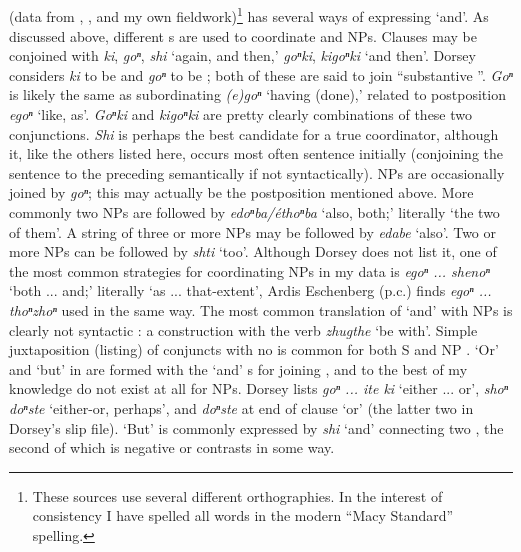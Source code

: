\documentclass[output=paper]{LSP/langsci}
\begin{document}
\subsection{}
 
\textbf{} (data from \citealt{DorseyNDPonka} \citealt{DorseyNDOmahaPonca},  \citealt{Koontz1984}, \citealt{Rudin2003} and my own fieldwork)\footnote{These sources use several different orthographies. In the interest of consistency I have spelled all  words in the modern ``Macy Standard'' spelling.} has several ways of expressing `and'. As discussed above, different s are used to coordinate  and NPs. Clauses may be conjoined with \textit{ki}, \textit{goⁿ}, \textit{shi} `again, and then,' \textit{goⁿki}, \textit{kigoⁿki} `and then'. Dorsey considers \textit{ki} to be  and \textit{goⁿ} to be ; both of these are said to join ``substantive ''. \textit{Goⁿ} is likely the same as subordinating \textit{(e)goⁿ} `having (done),' related to postposition \textit{egoⁿ} `like, as'. \textit{Goⁿki} and \textit{kigoⁿki} are pretty clearly combinations of these two conjunctions. \textit{Shi} is perhaps the best candidate for a true coordinator, although it, like the others listed here, occurs most often sentence initially (conjoining the sentence to the preceding  semantically if not syntactically). NPs are occasionally joined by \textit{goⁿ}; this may actually be the postposition mentioned above. More commonly two NPs are followed by \textit{edoⁿba/éthoⁿba} `also, both;' literally `the two of them'. A string of three or more NPs may be followed by \textit{edabe} `also'. Two or more NPs can be followed by \textit{shti} `too'. Although Dorsey does not list it, one of the most common strategies for coordinating NPs in my data is \textit{egoⁿ ... shenoⁿ} `both ... and;' literally `as ... that-extent', Ardis Eschenberg (p.c.) finds \textit{egoⁿ ... thoⁿzhoⁿ} used in the same way. The most common translation of `and' with NPs is clearly not syntactic : a  construction with the verb \textit{zhugthe} `be with'. Simple juxtaposition (listing) of conjuncts with no  is common for both S and NP . `Or' and `but' in  are formed with the `and' s for joining , and to the best of my knowledge do not exist at all for NPs. Dorsey lists \textit{goⁿ ... ite ki} `either ... or', \textit{shoⁿ doⁿste} `either-or, perhaps', and \textit{doⁿste} at end of clause `or' (the latter two in Dorsey's slip file). `But' is commonly expressed by \textit{shi} `and' connecting two , the second of which is negative or contrasts in some way.
\end{document}
